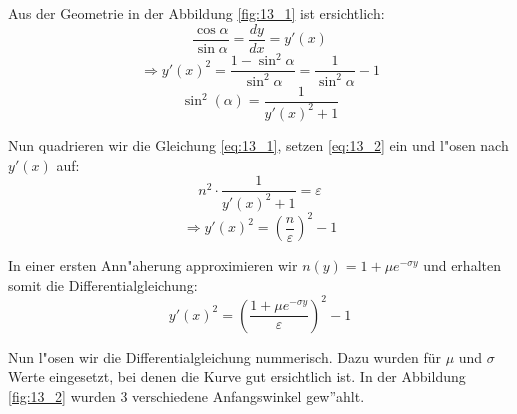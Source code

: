Aus der Geometrie in der Abbildung \ref{fig:13_1} ist ersichtlich:
$$\frac{\cos \alpha}{\sin \alpha} = \frac{dy}{dx} = y'(x)$$
$$\Rightarrow y'(x)^2 = \frac{1 - \sin^2 \alpha}{\sin^2 \alpha} = \frac{1}{\sin^2
\alpha} - 1$$
\begin{equation} \label{eq:13_2}
\sin^2 (\alpha) = \frac{1}{y'(x)^2 + 1}
\end{equation}

Nun quadrieren wir die Gleichung \ref{eq:13_1}, setzen \ref{eq:13_2} ein und l"osen
nach $y'(x)$ auf:
$$n^2 \cdot \frac{1}{y'(x)^2 + 1} = \varepsilon$$
\begin{equation} \label{eq:13_3}
\Rightarrow y'(x)^2 = \left( \frac{n}{\varepsilon} \right)^2 - 1
\end{equation}

In einer ersten Ann"aherung approximieren wir $n(y) = 1 + \mu e^{-\sigma y}$ und erhalten
somit die Differentialgleichung:
\begin{equation} \label{eq:13_4}
y'(x)^2 = \left( \frac{1 + \mu e^{-\sigma y}}{\varepsilon} \right)^2 - 1
\end{equation}

Nun l"osen wir die Differentialgleichung nummerisch. Dazu wurden für $\mu$ und $\sigma$
Werte eingesetzt, bei denen die Kurve gut ersichtlich ist. In der Abbildung
\ref{fig:13_2} wurden 3 verschiedene Anfangswinkel gew''ahlt.

